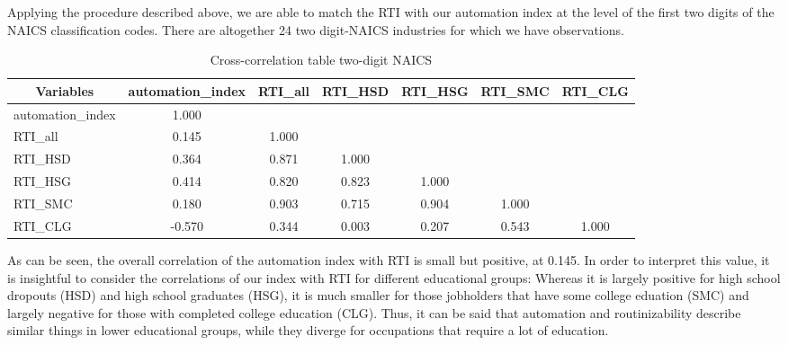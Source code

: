 \documentclass[11pt,a4paper]{article}
\begin{document}
Applying the procedure described above, we are able to match the RTI with our automation index at the level of the first two digits of the NAICS classification codes. There are altogether 24 two digit-NAICS industries for which we have observations.

\begin{comment}
\begin{table}[htbp]\centering \small \caption{Cross-correlation table one-digit NAICS\label{corrtable1}}
	\begin{tabular}{l  c  c  c  c  c  c }\hline\hline
		\multicolumn{1}{c}{Variables} &automation\_index&RTI\_all&
		RTI\_HSD&RTI\_HSG&RTI\_SMC&RTI\_CLG\\ \hline
		automation\_index&1.000\\
		RTI\_all&0.607&1.000\\
		RTI\_HSD&0.764&0.878&1.000\\
		RTI\_HSG&0.693&0.935&0.870&1.000\\
		RTI\_SMC&0.541&0.940&0.724&0.921&1.000\\
		RTI\_CLG&-0.418&0.191&-0.212&0.216&0.421&1.000\\
		\hline \hline 
	\end{tabular}
\end{table}
\end{comment}

\vspace{0.5cm}
\begin{table}[htbp]\centering \small \caption{Cross-correlation table two-digit NAICS\label{corrtable2}}
	\begin{tabular}{l  c  c  c  c  c  c }\toprule
		\multicolumn{1}{c}{Variables} &automation\_index&RTI\_all&
		RTI\_HSD&RTI\_HSG&RTI\_SMC&RTI\_CLG\\ \midrule
		automation\_index&1.000\\
		RTI\_all&0.145&1.000\\
		RTI\_HSD&0.364&0.871&1.000\\
		RTI\_HSG&0.414&0.820&0.823&1.000\\
		RTI\_SMC&0.180&0.903&0.715&0.904&1.000\\
		RTI\_CLG&-0.570&0.344&0.003&0.207&0.543&1.000\\
		\bottomrule 
	\end{tabular}
\end{table}
\vspace{0.5cm}

As can be seen, the overall correlation of the automation index with RTI is small but positive, at 0.145. In order to interpret this value, it is insightful to consider the correlations of our index with RTI for different educational groups: Whereas it is largely positive for high school dropouts (HSD) and high school graduates (HSG), it is much smaller for those jobholders that have some college eduation (SMC) and largely negative for those with completed college education (CLG). Thus, it can be said that automation and routinizability describe similar things in lower educational groups, while they diverge for occupations that require a lot of education.
\end{document}
